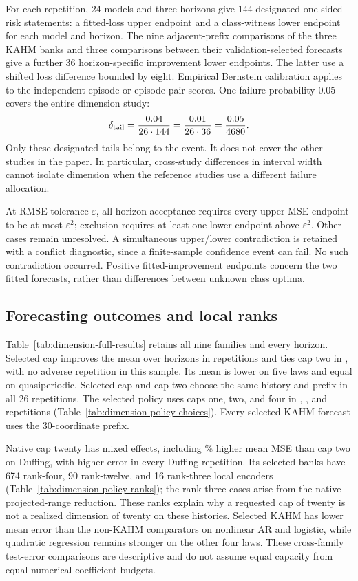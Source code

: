 For each repetition, 24 models and three horizons give 144 designated
one-sided risk statements: a fitted-loss upper endpoint and a class-witness
lower endpoint for each model and horizon. The nine adjacent-prefix comparisons
of the three KAHM banks and three comparisons between their validation-selected
forecasts give a further 36 horizon-specific improvement lower endpoints.
The latter use a shifted loss difference bounded by eight. Empirical Bernstein
calibration applies to the independent episode or episode-pair scores.
One failure probability $0.05$ covers the entire dimension study:
\[
 \delta_{\rm tail}
 =\frac{0.04}{26\cdot144}
 =\frac{0.01}{26\cdot36}
 =\frac{0.05}{4680}.
\]
Only these designated tails belong to the event. It does not cover the other
studies in the paper. In particular, cross-study differences in interval
width cannot isolate dimension when the reference studies use a different
failure allocation.

At RMSE tolerance $\varepsilon$, all-horizon acceptance requires every
upper-MSE endpoint to be at most $\varepsilon^2$; exclusion requires at least
one lower endpoint above $\varepsilon^2$. Other cases remain unresolved.
A simultaneous upper/lower contradiction is retained with a conflict
diagnostic, since a finite-sample confidence event can fail. No such
contradiction occurred. Positive fitted-improvement endpoints concern the
two fitted forecasts, rather than differences between unknown class optima.

\subsection{Forecasting outcomes and local ranks}

Table~\ref{tab:dimension-full-results} retains all nine families and every
horizon. Selected cap improves the mean over horizons in \DimBetterRuns{}
repetitions and ties cap two in \DimEqualRuns{}, with no adverse repetition
in this sample. Its mean is lower on five laws and equal on quasiperiodic.
Selected cap and cap two choose the same history and prefix in all 26
repetitions. The selected policy uses caps one, two, and four in
\DimCapOneCount{}, \DimCapTwoCount{}, and \DimCapFourCount{} repetitions
(Table~\ref{tab:dimension-policy-choices}). Every selected KAHM forecast
uses the 30-coordinate prefix.

Native cap twenty has mixed effects, including
\DimNativeDuffingIncrease\% higher mean MSE than cap two on Duffing, with
higher error in every Duffing repetition. Its selected banks have 674
rank-four, 90 rank-twelve, and 16 rank-three local encoders
(Table~\ref{tab:dimension-policy-ranks}); the rank-three cases arise from
the native projected-range reduction. These ranks explain why a requested
cap of twenty is not a realized dimension of twenty on these histories.
Selected KAHM has lower mean error than the non-KAHM comparators on nonlinear
AR and logistic, while quadratic regression remains stronger on the other
four laws. These cross-family test-error comparisons are descriptive and
do not assume equal capacity from equal numerical coefficient budgets.

